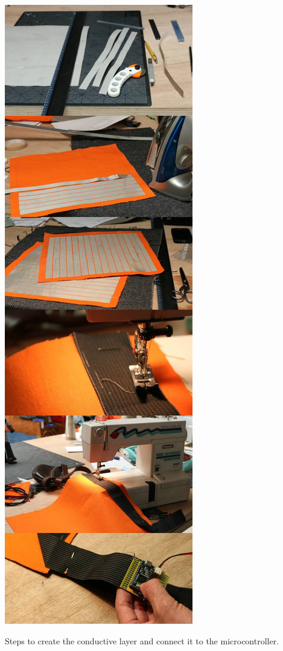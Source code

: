 \documentclass{sigchi-ext}
\begin{document}
\begin{marginfigure}[-57ex]
  \begin{minipage}{\marginparwidth}
    \centering
    \includegraphics[width=0.9\marginparwidth]{figures/tutorial}
    \caption{Steps to create the conductive layer and connect it to the microcontroller.}~\label{fig:tutorial}
  \end{minipage}
\end{marginfigure}
\end{document}
